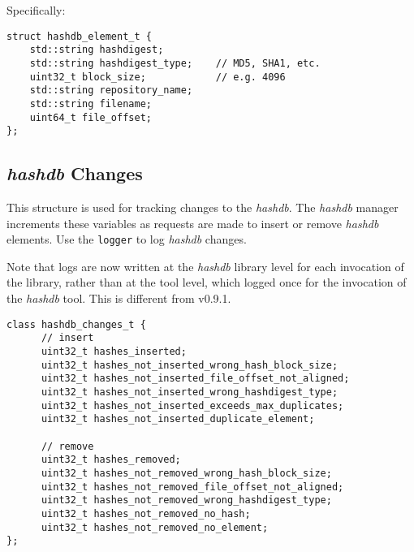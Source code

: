 \documentclass[12pt,twoside]{article}
\newcommand{\hdb}{\emph{hashdb}\xspace}
\begin{document}
Specifically:
\begin{small}
\begin{verbatim}
struct hashdb_element_t {
    std::string hashdigest;
    std::string hashdigest_type;    // MD5, SHA1, etc.
    uint32_t block_size;            // e.g. 4096
    std::string repository_name;
    std::string filename;
    uint64_t file_offset;
};
\end{verbatim}
\end{small}

\subsection{\hdb Changes}
This structure is used for tracking changes to the \hdb.
The \hdb manager increments these variables
as requests are made to insert or remove \hdb elements.
Use the \texttt{logger} to log \hdb changes.

Note that logs are now written at the \hdb library level
for each invocation of the library,
rather than at the tool level, which logged once
for the invocation of the \hdb tool.
This is different from v0.9.1.

\begin{small}
\begin{verbatim}
class hashdb_changes_t {
      // insert
      uint32_t hashes_inserted;
      uint32_t hashes_not_inserted_wrong_hash_block_size;
      uint32_t hashes_not_inserted_file_offset_not_aligned;
      uint32_t hashes_not_inserted_wrong_hashdigest_type;
      uint32_t hashes_not_inserted_exceeds_max_duplicates;
      uint32_t hashes_not_inserted_duplicate_element;

      // remove
      uint32_t hashes_removed;
      uint32_t hashes_not_removed_wrong_hash_block_size;
      uint32_t hashes_not_removed_file_offset_not_aligned;
      uint32_t hashes_not_removed_wrong_hashdigest_type;
      uint32_t hashes_not_removed_no_hash;
      uint32_t hashes_not_removed_no_element;
};
\end{verbatim}
\end{small}

\end{document}
